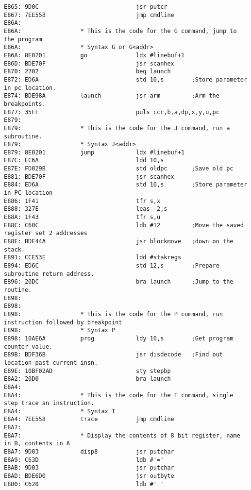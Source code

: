 {\begin{verbatim}
E865: 9D0C                            jsr putcr
E867: 7EE558                          jmp cmdline             
E86A:                 
E86A:                 * This is the code for the G command, jump to the program
E86A:                 * Syntax G or G<addr>
E86A: 8E0201          go              ldx #linebuf+1
E86D: BDE70F                          jsr scanhex
E870: 2702                            beq launch              
E872: ED6A                            std 10,s        ;Store parameter in pc location.
E874: BDE98A          launch          jsr arm         ;Arm the breakpoints.  
E877: 35FF                            puls ccr,b,a,dp,x,y,u,pc
E879:                 
E879:                 * This is the code for the J command, run a subroutine.
E879:                 * Syntax J<addr>
E879: 8E0201          jump            ldx #linebuf+1
E87C: EC6A                            ldd 10,s                
E87E: FD029B                          std oldpc       ;Save old pc
E881: BDE70F                          jsr scanhex
E884: ED6A                            std 10,s        ;Store parameter in PC location
E886: 1F41                            tfr s,x
E888: 327E                            leas -2,s
E88A: 1F43                            tfr s,u
E88C: C60C                            ldb #12         ;Move the saved register set 2 addresses
E88E: BDE44A                          jsr blockmove   ;down on the stack.
E891: CCE53E                          ldd #stakregs
E894: ED6C                            std 12,s        ;Prepare subroutine return address.
E896: 20DC                            bra launch      ;Jump to the routine.
E898:                 
E898:                 
E898:                 * This is the code for the P command, run instruction followed by breakpoint
E898:                 * Syntax P
E898: 10AE6A          prog            ldy 10,s        ;Get program counter value.
E89B: BDF36B                          jsr disdecode   ;Find out location past current insn.
E89E: 10BF02AD                        sty stepbp
E8A2: 20D0                            bra launch
E8A4:                 
E8A4:                 * This is the code for the T command, single step trace an instruction.
E8A4:                 * Syntax T
E8A4: 7EE558          trace           jmp cmdline
E8A7:                 
E8A7:                 * Display the contents of 8 bit register, name in B, contents in A
E8A7: 9D03            disp8           jsr putchar
E8A9: C63D                            ldb #'='
E8AB: 9D03                            jsr putchar
E8AD: BDE6D0                          jsr outbyte
E8B0: C620                            ldb #' '

\end{verbatim}}
